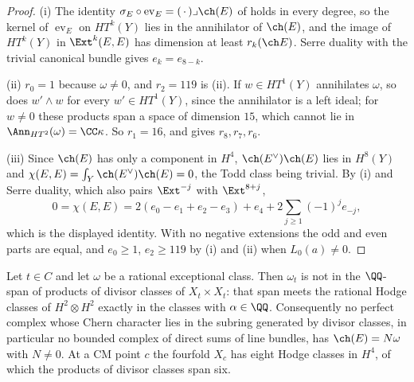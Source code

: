\begin{proof}
(i) The identity $\sigma_{E}\circ\operatorname{ev}_{E}=(\,\cdot\,)\lrcorner
\ch(E)$ of  holds in every degree, so the kernel of
$\operatorname{ev}_{E}$ on $HT^{k}(Y)$ lies in the annihilator of $\ch(E)$,
and the image of $HT^{k}(Y)$ in $\Ext^{k}(E,E)$ has dimension at least
$r_{k}(\ch E)$. Serre duality with the trivial canonical bundle gives
$e_{k}=e_{8-k}$.

(ii) $r_{0}=1$ because $\omega\ne0$, and $r_{2}=119$ is
(ii). If $w\in HT^{1}(Y)$ annihilates $\omega$, so does
$w'\wedge w$ for every $w'\in HT^{1}(Y)$, since the annihilator is a left
ideal; for $w\ne0$ these products span a space of dimension $15$, which cannot
lie in $\Ann_{HT^{2}}(\omega)=\CC\kappa$. So $r_{1}=16$, and
 gives $r_{8},r_{7},r_{6}$.

(iii) Since $\ch(E)$ has only a component in $H^{4}$, $\ch(E^{\vee})\ch(E)$
lies in $H^{8}(Y)$ and $\chi(E,E)=\int_{Y}\ch(E^{\vee})\ch(E)=0$, the Todd
class being trivial. By (i) and Serre duality, which also pairs
$\Ext^{-j}$ with $\Ext^{8+j}$,
\[
  0=\chi(E,E)=2(e_{0}-e_{1}+e_{2}-e_{3})+e_{4}
  +2\sum_{j\ge1}(-1)^{j}e_{-j},
\]
which is the displayed identity. With no negative extensions the odd and even
parts are equal, and $e_{0}\ge1$, $e_{2}\ge119$ by (i) and (ii) when
$L_{0}(a)\ne0$.
\end{proof}

\begin{proposition}
\label{prop:mumforddivisor}
Let $t\in C$ and let $\omega$ be a rational exceptional class. Then $\omega_{t}$
is not in the $\QQ$-span of products of divisor classes of $X_{t}\times
X_{t}$: that span meets the rational Hodge classes of $H^{2}\otimes H^{2}$
exactly in the classes with $\alpha\in\QQ$. Consequently no perfect complex
whose Chern character lies in the subring generated by divisor classes, in
particular no bounded complex of direct sums of line bundles, has
$\ch(E)=N\omega$ with $N\ne0$. At a CM point $c$ the fourfold $X_{c}$ has eight
Hodge classes in $H^{4}$, of which the products of divisor classes span six.
\end{proposition}

